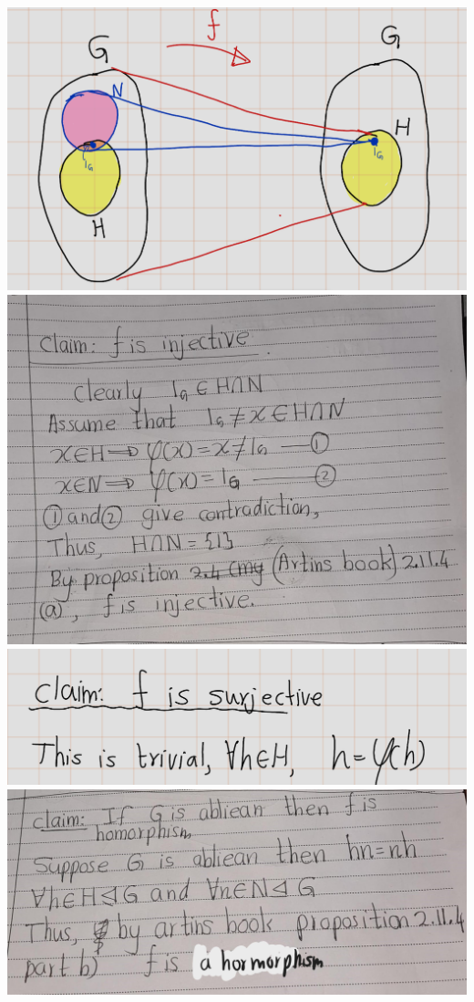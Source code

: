 \documentclass[
]{book}
\theoremstyle{definition}
\theoremstyle{definition}
\theoremstyle{definition}
\theoremstyle{definition}
\theoremstyle{remark}
\begin{document}
\includegraphics{figures/ch_2/fig06.png}
\includegraphics{figures/ch_2/fig07.jpg}
\includegraphics{figures/ch_2/fig09.png}
\includegraphics{figures/ch_2/fig08.jpg}
\end{document}
